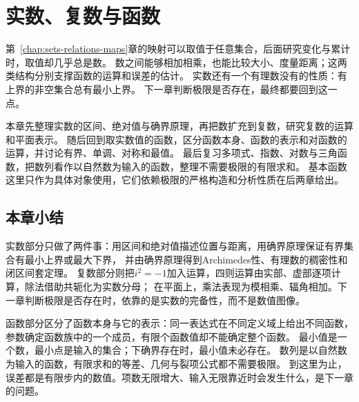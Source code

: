 \chapter{实数、复数与函数}
\label{chap:real-complex-functions}

第~\ref{chap:sets-relations-maps}章的映射可以取值于任意集合，后面研究变化与累计时，取值却几乎总是数。
数之间能够相加相乘，也能比较大小、度量距离；这两类结构分别支撑函数的运算和误差的估计。
实数还有一个有理数没有的性质：有上界的非空集合总有最小上界。
下一章判断极限是否存在，最终都要回到这一点。

本章先整理实数的区间、绝对值与确界原理，再把数扩充到复数，研究复数的运算和平面表示。
随后回到取实数值的函数，区分函数本身、函数的表示和对函数的运算，并讨论有界、单调、对称和最值。
最后复习多项式、指数、对数与三角函数，把数列看作以自然数为输入的函数，整理不需要极限的有限求和。
基本函数这里只作为具体对象使用，它们依赖极限的严格构造和分析性质在后两章给出。








\FloatBarrier
\section{本章小结}
\label{sec:real-complex-functions-summary}

实数部分只做了两件事：用区间和绝对值描述位置与距离，用确界原理保证有界集合有最小上界或最大下界，
并由确界原理得到Archimedes性、有理数的稠密性和闭区间套定理。
复数部分则把$i^2=-1$加入运算，四则运算由实部、虚部逐项计算，除法借助共轭化为实数分母；
在平面上，乘法表现为模相乘、辐角相加。下一章判断极限是否存在时，依靠的是实数的完备性，而不是数值图像。

函数部分区分了函数本身与它的表示：同一表达式在不同定义域上给出不同函数，参数确定函数族中的一个成员，有限个函数值却不能确定整个函数。
最小值是一个数，最小点是输入的集合；下确界存在时，最小值未必存在。
数列是以自然数为输入的函数，有限求和的等差、几何与裂项公式都不需要极限。
到这里为止，误差都是有限步内的数值。项数无限增大、输入无限靠近时会发生什么，是下一章的问题。
